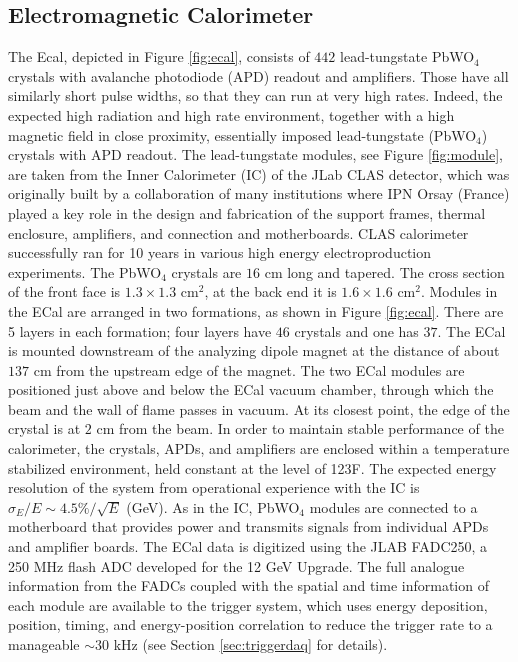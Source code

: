 \subsection{Electromagnetic Calorimeter} 
\label{sec:ecal}

The Ecal, depicted in Figure \ref{fig:ecal}, consists of $442$ lead-tungstate PbWO$_4$ crystals with avalanche photodiode (APD) readout and amplifiers. Those have all similarly short pulse widths, so that they can run at very high rates. Indeed, the expected high radiation and high rate environment, together with a high magnetic field in close proximity, essentially imposed lead-tungstate (PbWO$_4$) crystals with APD readout. The lead-tungstate modules, see Figure \ref{fig:module}, are taken from the Inner Calorimeter (IC) of the JLab CLAS detector, which was originally built by a collaboration of many institutions where IPN Orsay (France) played a key role in the design and fabrication of the support frames, thermal enclosure, amplifiers, and connection and motherboards. CLAS calorimeter successfully ran for 10 years in various high energy electroproduction experiments. The PbWO$_4$ crystals are $16$ cm long and tapered. The cross section of the front face is $1.3\times 1.3$ cm$^2$, at the back end it is $1.6\times 1.6$ cm$^2$. Modules in the ECal are arranged in two formations, as shown in Figure \ref{fig:ecal}. There are 5 layers in each formation; four layers have $46$ crystals and one has $37$. The ECal is mounted downstream of the analyzing dipole magnet at the distance of about $137$ cm from the upstream edge of the magnet. The two ECal modules are positioned just above and below the ECal vacuum chamber, through which the beam and the wall of flame passes in vacuum. At its closest point, the edge of the crystal is at $2$ cm from the beam. In order to maintain stable performance of the calorimeter, the crystals, APDs, and amplifiers are enclosed within a temperature stabilized environment, held constant at the level of 1\!\char23F. The expected energy resolution of the system from operational experience with the IC is $\sigma_E/E \sim 4.5\%/\sqrt{E}$ (GeV). As in the IC, PbWO$_4$ modules are connected to a motherboard that provides power and transmits signals from individual APDs and amplifier boards. The ECal data is digitized using the JLAB FADC250, a 250 MHz flash ADC developed for the 12 GeV Upgrade. The full analogue information from the FADCs coupled with the spatial and time information of each module are available to the trigger system, which uses energy deposition, position, timing, and energy-position correlation to reduce the trigger rate to a manageable $\sim 30$ kHz (see Section \ref{sec:triggerdaq} for details).

